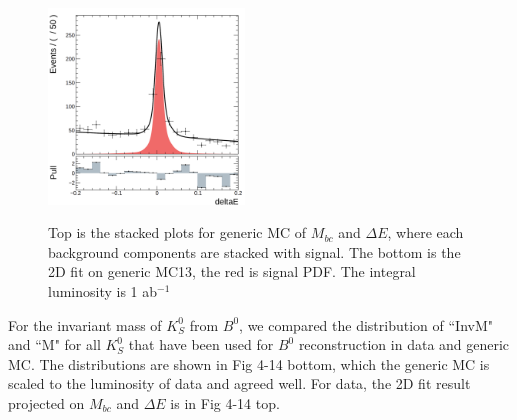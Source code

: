 \begin{figure}[H]
\begin{minipage}[b]{0.5\linewidth}
		\centering 
		\includegraphics[height=5.2cm]{figures/dE-hist-2d}
		\label{}
	\end{minipage}
	\caption{Top is the stacked plots for generic MC of $M_{bc}$ and $\Delta E$, where each background components are stacked with signal. The bottom is the 2D fit on generic MC13, the red is signal PDF. The integral luminosity is 1 ab$^{-1}$}
\end{figure}
For the invariant mass of $K_S^0$ from $B^0$, we compared the distribution of ``InvM" and ``M" for all $K_S^0$ that have been used for $B^0$ reconstruction in data and generic MC. The distributions are shown in Fig 4-14 bottom, which the generic MC is scaled to the luminosity of data and agreed well.
For data, the 2D fit result projected on $M_{bc}$ and $\Delta E$ is in Fig 4-14 top.  
